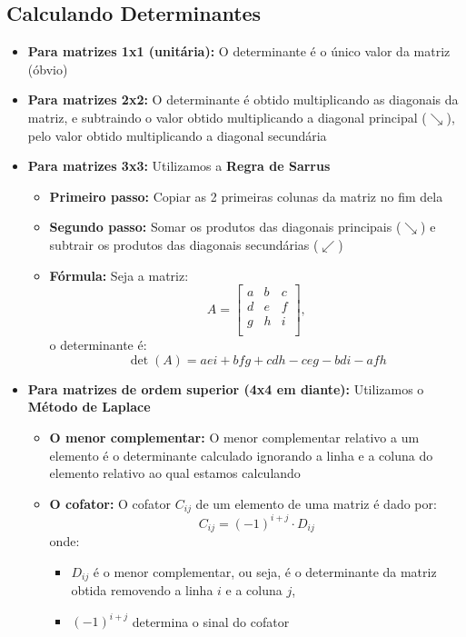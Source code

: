 \documentclass{article}
\begin{document}
\subsection{Calculando Determinantes}
\begin{itemize}
    \item \textbf{Para matrizes 1x1 (unitária):} O determinante é o único valor da matriz (óbvio)
    \item \textbf{Para matrizes 2x2:} O determinante é obtido multiplicando as diagonais da matriz, e subtraindo o valor obtido multiplicando a diagonal principal ($\searrow$), pelo valor obtido multiplicando a diagonal secundária
    \item \textbf{Para matrizes 3x3:} Utilizamos a \textbf{Regra de Sarrus}
    \begin{itemize}
        \item \textbf{Primeiro passo:} Copiar as 2 primeiras colunas da matriz no fim dela
        \item \textbf{Segundo passo:} Somar os produtos das diagonais principais ($\searrow$) e subtrair os produtos das diagonais secundárias ($\swarrow$)
        \item \textbf{Fórmula:} Seja a matriz:
        \[
        A = \begin{bmatrix}
            a & b & c \\
            d & e & f \\
            g & h & i \\
        \end{bmatrix},
        \]
        o determinante é:
        \[
        \det(A) = aei + bfg + cdh - ceg - bdi - afh
        \]
    \end{itemize}
    
    \item \textbf{Para matrizes de ordem superior (4x4 em diante):} Utilizamos o \textbf{Método de Laplace}
    \begin{itemize}
        \item \textbf{O menor complementar:} O menor complementar relativo a um elemento é o determinante calculado ignorando a linha e a coluna do elemento relativo ao qual estamos calculando
        \item \textbf{O cofator:} O cofator \( C_{ij} \) de um elemento de uma matriz é dado por:
        \[
        C_{ij} = (-1)^{i+j} \cdot D_{ij}
        \]
        onde:
        \begin{itemize}
            \item \( D_{ij} \) é o menor complementar, ou seja, é o determinante da matriz obtida removendo a linha \( i \) e a coluna \( j \),
            \item \( (-1)^{i+j} \) determina o sinal do cofator
        \end{itemize} 
    \end{itemize}
\end{itemize}
\end{document}
